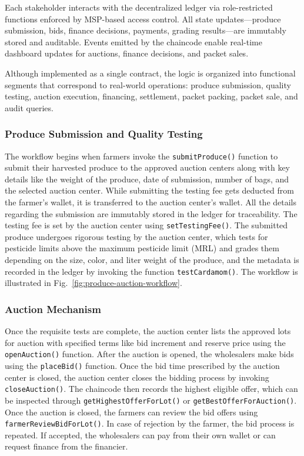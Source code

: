 \documentclass[12pt]{article}
\begin{document}
	
	Each stakeholder interacts with the decentralized ledger via role-restricted functions enforced by MSP-based access control.
	All state updates—produce submission, bids, finance decisions, payments, grading results—are immutably stored and auditable.
	Events emitted by the chaincode enable real-time dashboard updates for auctions, finance decisions, and packet sales.
	
	Although implemented as a single contract, the logic is organized into functional segments that correspond to real-world operations: produce submission, quality testing, auction execution, financing, settlement, packet packing, packet sale, and audit queries.
	
	
	\subsubsection{Produce Submission and Quality Testing}
	The workflow begins when farmers invoke the \texttt{submitProduce()} function to submit their harvested produce to the approved auction centers along with key details like the weight of the produce, date of submission, number of bags, and the selected auction center. While submitting the testing fee gets deducted from the farmer's wallet, it is transferred to the auction center's wallet. All the details regarding the submission are immutably stored in the ledger for traceability. The testing fee is set by the auction center using \texttt{setTestingFee()}. The submitted produce undergoes rigorous testing by the auction center, which tests for pesticide limits above the maximum pesticide limit (MRL) and grades them depending on the size, color, and liter weight of the produce, and the metadata is recorded in the ledger by invoking the function \texttt{testCardamom()}. The workflow is illustrated in Fig.~\ref{fig:produce-auction-workflow}.
	
	
	
	\subsubsection{Auction Mechanism}
	
	Once the requisite tests are complete, the auction center lists the approved lots for auction with specified terms like bid increment and reserve price using the \texttt{openAuction()} function. After the auction is opened, the wholesalers make bids using the \texttt{placeBid()} function. Once the bid time prescribed by the auction center is closed, the auction center closes the bidding process by invoking \texttt{closeAuction()}. The chaincode then records the highest eligible offer, which can be inspected through \texttt{getHighestOfferForLot()} or \texttt{getBestOfferForAuction()}. Once the auction is closed, the farmers can review the bid offers using \texttt{farmerReviewBidForLot()}. In case of rejection by the farmer, the bid process is repeated. If accepted, the wholesalers can pay from their own wallet or can request finance from the financier. 
	
\end{document}
